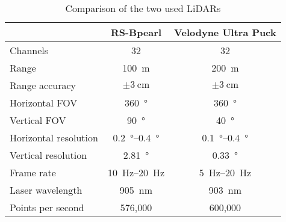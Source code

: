 \begin{table}[ht]
	\centering
	\caption{Comparison of the two used LiDARs \cite{RoboSense2020}\cite{Rev}}
	\label{tab:lidar_datasheets}
	\begin{tabular}[t]{lcc}
	\toprule
	&\textbf{RS-Bpearl} & \textbf{Velodyne Ultra Puck}\\
	\midrule
	Channels 				& 32 							& 32\\
	Range 					& \SI{100}{\metre}				& \SI{200}{\metre}\\
	Range accuracy			& $\pm\SI{3}{\centi\metre}$		& $\pm\SI{3}{\centi\metre}$\\
	Horizontal FOV		 	& \SI{360}{\degree}				& \SI{360}{\degree}\\
	Vertical FOV 			& \SI{90}{\degree}				& \SI{40}{\degree}\\
	Horizontal resolution	& \SIrange{0.2}{0.4}{\degree} 	& \SIrange{0.1}{0.4}{\degree}\\
	Vertical resolution		& \SI{2.81}{\degree} 			& \SI{0.33}{\degree}\\
	Frame rate 				& \SIrange{10}{20}{\hertz}		& \SIrange{5}{20}{\hertz}\\
	Laser wavelength 		& \SI{905}{\nano\metre} 		& \SI{903}{\nano\metre}\\
	Points per second 		& 576,000						& 600,000		\\
	\bottomrule
	\end{tabular}
	\end{table}%


